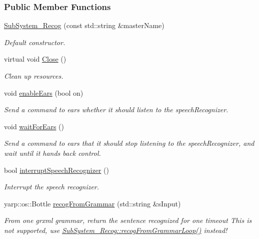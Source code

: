 \subsubsection*{Public Member Functions}
\begin{DoxyCompactItemize}
\item 
\hyperlink{group__icubclient__subsystems_a34901d18dab1e223997127715c77128a}{Sub\+System\+\_\+\+Recog} (const std\+::string \&master\+Name)
\begin{DoxyCompactList}\small\item\em Default constructor. \end{DoxyCompactList}\item 
virtual void \hyperlink{group__icubclient__subsystems_a8f41f3c801e0d0b705927dbc56959137}{Close} ()
\begin{DoxyCompactList}\small\item\em Clean up resources. \end{DoxyCompactList}\item 
void \hyperlink{group__icubclient__subsystems_a7ed85c0ef3ec62ea019c8d8e0f674728}{enable\+Ears} (bool on)
\begin{DoxyCompactList}\small\item\em Send a command to ears whether it should listen to the speech\+Recognizer. \end{DoxyCompactList}\item 
void \hyperlink{group__icubclient__subsystems_af1341f293fd5b5e8ec021e31915d5b16}{wait\+For\+Ears} ()
\begin{DoxyCompactList}\small\item\em Send a command to ears that it should stop listening to the speech\+Recognizer, and wait until it hands back control. \end{DoxyCompactList}\item 
bool \hyperlink{group__icubclient__subsystems_ae69feadf3793487af1bd5649c387f0c0}{interrupt\+Speech\+Recognizer} ()
\begin{DoxyCompactList}\small\item\em Interrupt the speech recognizer. \end{DoxyCompactList}\item 
yarp\+::os\+::\+Bottle \hyperlink{group__icubclient__subsystems_a0668882e39bd038825a47a835180e4c6}{recog\+From\+Grammar} (std\+::string \&s\+Input)
\begin{DoxyCompactList}\small\item\em From one grxml grammar, return the sentence recognized for one timeout This is not supported, use \hyperlink{group__icubclient__subsystems_ab0fdeaa8f84fb8d1062259921407d0f7}{Sub\+System\+\_\+\+Recog\+::recog\+From\+Grammar\+Loop()} instead! \end{DoxyCompactList}\item 

\end{DoxyCompactItemize}

